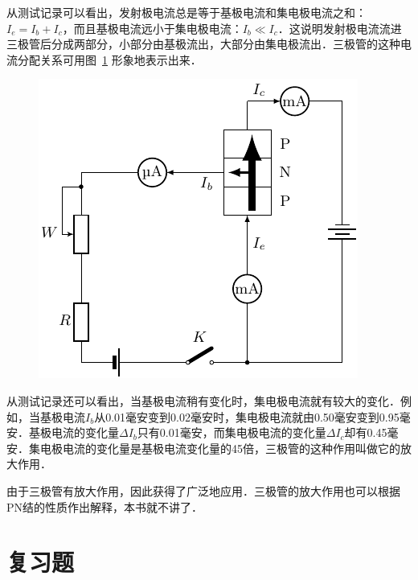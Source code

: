 从测试记录可以看出，发射极电流总是等于基极电流和集电极电流之和：$I_e=I_b+I_c$，而且基极电流远小于集电极电流：$I_b\ll I_c$．这说明发射极电流流进三极管后分成两部分，小部分由基极流出，大部分由集电极流出．三极管的这种电流分配关系可用图~\ref{fig_B_8-31} 形象地表示出来．
\begin{figure}[htbp]
    \centering
    \includegraphics{fig/B/8-31.pdf}
    \caption{}\label{fig_B_8-31}
\end{figure}

从测试记录还可以看出，当基极电流稍有变化时，集电极电流就有较大的变化．例如，当基极电流$I_b$从0.01毫安变到0.02毫安时，集电极电流就由0.50毫安变到0.95毫安．基极电流的变化量$\Delta I_b$只有0.01毫安，而集电极电流的变化量$\Delta I_c$却有0.45毫安．集电极电流的变化量是基极电流变化量的45倍，三极管的这种作用叫做它的放大作用．

由于三极管有放大作用，因此获得了广泛地应用．三极管的放大作用也可以根据PN结的性质作出解释，本书就不讲了．


\section*{复习题}

